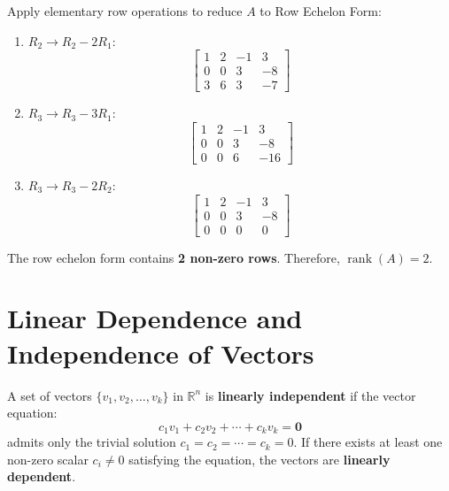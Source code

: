 \begin{solutionbox}
Apply elementary row operations to reduce $A$ to Row Echelon Form:
\begin{enumerate}[leftmargin=1.5em]
    \item $R_2 \to R_2 - 2R_1$:
    \begin{equation}
    \begin{bmatrix}
    1 & 2 & -1 & 3 \\
    0 & 0 & 3 & -8 \\
    3 & 6 & 3 & -7
    \end{bmatrix}
    \end{equation}
    \item $R_3 \to R_3 - 3R_1$:
    \begin{equation}
    \begin{bmatrix}
    1 & 2 & -1 & 3 \\
    0 & 0 & 3 & -8 \\
    0 & 0 & 6 & -16
    \end{bmatrix}
    \end{equation}
    \item $R_3 \to R_3 - 2R_2$:
    \begin{equation}
    \begin{bmatrix}
    1 & 2 & -1 & 3 \\
    0 & 0 & 3 & -8 \\
    0 & 0 & 0 & 0
    \end{bmatrix}
    \end{equation}
\end{enumerate}
The row echelon form contains \textbf{2 non-zero rows}. Therefore, $\operatorname{rank}(A) = 2$.
\end{solutionbox}

\section{Linear Dependence and Independence of Vectors}

\begin{definition}
A set of vectors $\{v_1, v_2, \dots, v_k\}$ in $\mathbb{R}^n$ is \textbf{linearly independent} if the vector equation:
\begin{equation}
c_1 v_1 + c_2 v_2 + \cdots + c_k v_k = \mathbf{0}
\end{equation}
admits only the trivial solution $c_1 = c_2 = \cdots = c_k = 0$. If there exists at least one non-zero scalar $c_i \ne 0$ satisfying the equation, the vectors are \textbf{linearly dependent}.
\end{definition}

